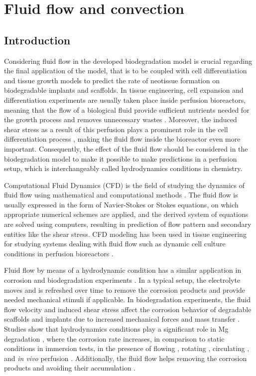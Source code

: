 \chapter{Fluid flow and convection}\label{ch:fluid}

\section{Introduction}

Considering fluid flow in the developed biodegradation model is crucial regarding the final application of the model, that is to be coupled with cell differentiation and tissue growth models to predict the rate of neotissue formation on biodegradable implants and scaffolds. In tissue engineering, cell expansion and differentiation experiments are usually taken place inside perfusion bioreactors, meaning that the flow of a biological fluid provide sufficient nutrients needed for the growth process and removes unnecessary wastes \cite{Sikavitsas2005,Grayson2010,Sonnaert2014}. Moreover, the induced shear stress as a result of this perfusion plays a prominent role in the cell differentiation process \cite{Song2013,McCoy2012,Rauh2011,Papantoniou2013}, making the fluid flow inside the bioreactor even more important. Consequently, the effect of the fluid flow should be considered in the biodegradation model to make it possible to make predictions in a perfusion setup, which is interchangeably called hydrodynamics conditions in chemistry.

Computational Fluid Dynamics (CFD) is the field of studying the dynamics of fluid flow using mathematical and computational methods \cite{H.Versteeg2007,Sharma2022}. The fluid flow is usually expressed in the form of Navier-Stokes or Stokes equations, on which appropriate numerical schemes are applied, and the derived system of equations are solved using computers, resulting in prediction of flow pattern and secondary entities like the shear stress. CFD modeling has been used in tissue engineering for studying systems dealing with fluid flow such as dynamic cell culture conditions in perfusion bioreactors \cite{Hutmacher2008, Hossain2012,Patrachari2012}. 

Fluid flow by means of a hydrodynamic condition has a similar application in corrosion and biodegradation experiments \cite{Wang2014}. In a typical setup, the electrolyte moves and is refreshed over time to remove the corrosion products and provide needed mechanical stimuli if applicable. In biodegradation experiments, the fluid flow velocity and induced shear stress affect the corrosion behavior of degradable scaffolds and implants due to increased mechanical forces and mass transfer \cite{Wang2014}. Studies show that hydrodynamics conditions play a significant role in Mg degradation \cite{Levesque2008}, where the corrosion rate increases, in comparison to static conditions in immersion tests, in the presence of flowing \cite{Li2012}, rotating \cite{Jafarzadeh2009}, circulating \cite{Chen2010}, and \textit{in vivo} perfusion \cite{Witte2013}. Additionally, the fluid flow helps removing the corrosion products and avoiding their accumulation \cite{Hiromoto2008}. 

